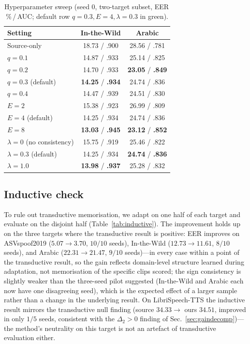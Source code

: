 \documentclass[conference]{IEEEtran}
\begin{document}
\begin{table}[t]
\centering
\caption{Hyperparameter sweep (seed 0, two-target subset, EER\,\%\,/\,AUC;
default row $q{=}0.3,E{=}4,\lambda{=}0.3$ in \colorbox{green!12}{green}).}
\label{tab:sweep}
\begin{tabular}{@{}lcc@{}}
\toprule
Setting & In-the-Wild & Arabic \\
\midrule
Source-only & 18.73 / .900 & 28.56 / .781 \\
\midrule
$q{=}0.1$ & 14.87 / .933 & 25.14 / .825 \\
$q{=}0.2$ & 14.70 / .933 & \textbf{23.05} / \textbf{.849} \\
\rowcolor{green!12}$q{=}0.3$ (default) & \textbf{14.25} / \textbf{.934} & 24.74 / .836 \\
$q{=}0.4$ & 14.47 / .939 & 24.51 / .830 \\
\midrule
$E{=}2$ & 15.38 / .923 & 26.99 / .809 \\
\rowcolor{green!12}$E{=}4$ (default) & 14.25 / .934 & 24.74 / .836 \\
$E{=}8$ & \textbf{13.03} / \textbf{.945} & \textbf{23.12} / \textbf{.852} \\
\midrule
$\lambda{=}0$ (no consistency) & 15.75 / .919 & 25.46 / .822 \\
\rowcolor{green!12}$\lambda{=}0.3$ (default) & 14.25 / .934 & \textbf{24.74} / \textbf{.836} \\
$\lambda{=}1.0$ & \textbf{13.98} / \textbf{.937} & 25.28 / .832 \\
\bottomrule
\end{tabular}
\end{table}

\subsection{Inductive check}
\label{sec:inductive}
To rule out transductive memorisation, we adapt on one half of each target and
evaluate on the disjoint half (Table~\ref{tab:inductive}). The improvement
holds up on the three targets where the transductive result is positive: EER
improves on ASVspoof2019 ($5.07\!\to\!3.70$, $10/10$ seeds), In-the-Wild
($12.73\!\to\!11.61$, $8/10$ seeds), and Arabic ($22.31\!\to\!21.47$, $9/10$
seeds)---in every case within a point of the transductive result, so the gain
reflects domain-level structure learned during adaptation, not memorisation of
the specific clips scored; the sign consistency is slightly weaker than the
three-seed pilot suggested (In-the-Wild and Arabic each now have one
disagreeing seed), which is the expected effect of a larger sample rather than
a change in the underlying result. On LibriSpeech-TTS the inductive result
mirrors the transductive null finding (source $34.33\!\to\!$ ours $34.51$,
improved in only $1/5$ seeds, consistent with the $\Delta_2{>}0$ finding of
Sec.~\ref{sec:gaindecomp})---the method's neutrality on this target is not an
artefact of transductive evaluation either.
\end{document}

